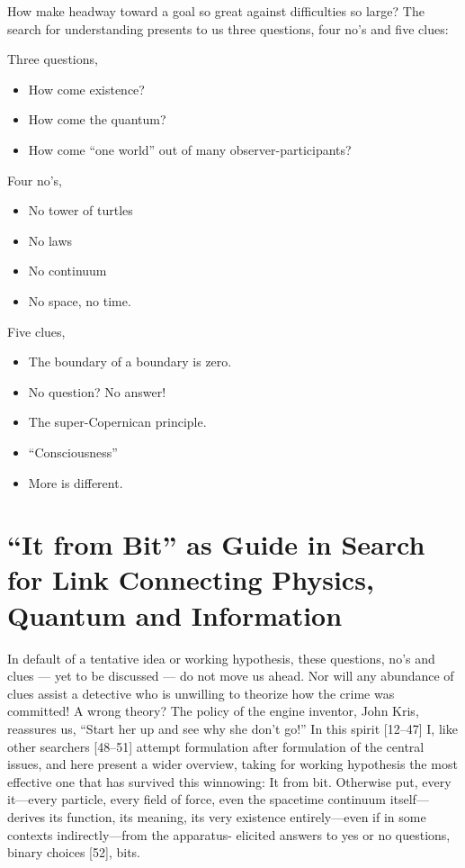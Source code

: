 \documentclass[11pt]{article}
\begin{document}
	How make headway toward a goal so great against difficulties so large? The
	search for understanding presents to us three questions, four no's and five clues:
	
	Three questions,
	\begin{itemize}[leftmargin=2em]
		\item How come existence?
		\item How come the quantum?
		\item How come ``one world'' out of many observer-participants?
	\end{itemize}
	
	Four no's,
	\begin{itemize}[leftmargin=2em]
		\item No tower of turtles
		\item No laws
		\item No continuum
		\item No space, no time.
	\end{itemize}
	
	Five clues,
	\begin{itemize}[leftmargin=2em]
		\item The boundary of a boundary is zero.
		\item No question? No answer!
		\item The super-Copernican principle.
		\item ``Consciousness''
		\item More is different.
	\end{itemize}
	
	\section{``It from Bit'' as Guide in Search for Link Connecting Physics, Quantum and Information}
	In default of a tentative idea or working hypothesis, these questions, no's and clues
	--- yet to be discussed --- do not move us ahead. Nor will any abundance of clues
	assist a detective who is unwilling to theorize how the crime was committed! A
	wrong theory? The policy of the engine inventor, John Kris, reassures us, ``Start
	her up and see why she don't go!'' In this spirit [12--47] I, like other searchers [48--51]
	attempt formulation after formulation of the central issues, and here present a wider
	overview, taking for working hypothesis the most effective one that has survived this
	winnowing: It from bit. Otherwise put, every it---every particle, every field of
	force, even the spacetime continuum itself---derives its function, its meaning, its
	very existence entirely---even if in some contexts indirectly---from the apparatus-
	elicited answers to yes or no questions, binary choices [52], bits.
	
\end{document}
